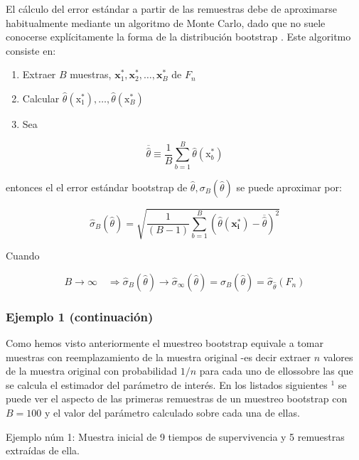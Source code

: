 \documentclass[
]{article}
\providecommand{\tightlist}{%
  \setlength{\itemsep}{0pt}\setlength{\parskip}{0pt}}
\begin{document}
El cálculo del error estándar a partir de las remuestras debe de aproximarse habitualmente mediante un algoritmo de Monte Carlo, dado que no suele conocerse explícitamente la forma de la distribución bootstrap . Este algoritmo consiste en:

\begin{enumerate}
\def\labelenumi{\arabic{enumi}.}
\tightlist
\item
  Extraer \(B\) muestras, \(\mathbf{x}_{1}^{*}, \mathbf{x}_{2}^{*}, \ldots, \mathbf{x}_{B}^{*}\) de \(F_{n}\)
\item
  Calcular \(\hat{\theta}\left(\mathrm{x}_{1}^{*}\right), \ldots, \hat{\theta}\left(\mathrm{x}_{B}^{*}\right)\)
\item
  Sea
\end{enumerate}

\[
\overline{\hat{\theta}} \equiv \frac{1}{B} \sum_{b=1}^{B} \hat{\theta}\left(\mathrm{x}_{b}^{*}\right)
\]

entonces el el error estándar bootstrap de \(\hat{\theta}, \sigma_{B}(\hat{\theta})\) se puede aproximar por:

\[
\hat{\sigma}_{B}(\hat{\theta})=\sqrt{\frac{1}{(B-1)} \sum_{b=1}^{B}\left(\hat{\theta}\left(\mathbf{x}_{\mathbf{i}}^{*}\right)-\overline{\hat{\theta}}\right)^{2}}
\]

Cuando

\[
B \rightarrow \infty \quad \Longrightarrow \hat{\sigma}_{B}(\hat{\theta}) \rightarrow \hat{\sigma}_{\infty}(\hat{\theta})=\sigma_{B}(\hat{\theta})=\hat{\sigma}_{\hat{\theta}}\left(F_{n}\right)
\]

\subsubsection{Ejemplo 1 (continuación)}\label{ejemplo-1-continuaciuxf3n}

Como hemos visto anteriormente el muestreo bootstrap equivale a tomar muestras con reemplazamiento de la muestra original -es decir extraer \(n\) valores de la muestra original con probabilidad \(1 / n\) para cada uno de ellossobre las que se calcula el estimador del parámetro de interés. En los listados
siguientes \({ }^{1}\) se puede ver el aspecto de las primeras remuestras de un muestreo bootstrap con \(B=100\) y el valor del parámetro calculado sobre cada una de ellas.

Ejemplo núm 1: Muestra inicial de 9 tiempos de supervivencia y 5 remuestras extraídas de ella.
\end{document}
